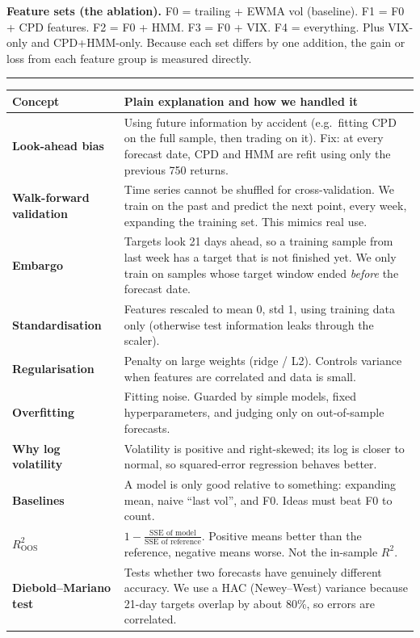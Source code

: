\documentclass[10pt]{article}
\newcommand{\h}[1]{\vspace{4pt}{\large\bfseries #1}\par\vspace{1pt}\hrule\vspace{3pt}}
\begin{document}
\textbf{Feature sets (the ablation).} F0 = trailing + EWMA vol (baseline). F1 = F0 + CPD features. F2 = F0 + HMM. F3 = F0 + VIX. F4 = everything. Plus VIX-only and CPD+HMM-only. Because each set differs by one addition, the gain or loss from each feature group is measured directly.

\h{5. The ML-rigour concepts (this is what examiners probe)}
\begin{tabular}{@{}p{1.55in}p{5.4in}@{}}\toprule
Concept & Plain explanation and how we handled it\\\midrule
\textbf{Look-ahead bias} & Using future information by accident (e.g.\ fitting CPD on the full sample, then trading on it). Fix: at every forecast date, CPD and HMM are refit using only the previous 750 returns.\\
\textbf{Walk-forward validation} & Time series cannot be shuffled for cross-validation. We train on the past and predict the next point, every week, expanding the training set. This mimics real use.\\
\textbf{Embargo} & Targets look 21 days ahead, so a training sample from last week has a target that is not finished yet. We only train on samples whose target window ended \emph{before} the forecast date.\\
\textbf{Standardisation} & Features rescaled to mean 0, std 1, using training data only (otherwise test information leaks through the scaler).\\
\textbf{Regularisation} & Penalty on large weights (ridge / L2). Controls variance when features are correlated and data is small.\\
\textbf{Overfitting} & Fitting noise. Guarded by simple models, fixed hyperparameters, and judging only on out-of-sample forecasts.\\
\textbf{Why log volatility} & Volatility is positive and right-skewed; its log is closer to normal, so squared-error regression behaves better.\\
\textbf{Baselines} & A model is only good relative to something: expanding mean, naive ``last vol'', and F0. Ideas must beat F0 to count.\\
\textbf{$R^2_{\text{OOS}}$} & $1-\frac{\text{SSE of model}}{\text{SSE of reference}}$. Positive means better than the reference, negative means worse. Not the in-sample $R^2$.\\
\textbf{Diebold--Mariano test} & Tests whether two forecasts have genuinely different accuracy. We use a HAC (Newey--West) variance because 21-day targets overlap by about 80\%, so errors are correlated.\\

\end{tabular}
\end{document}
